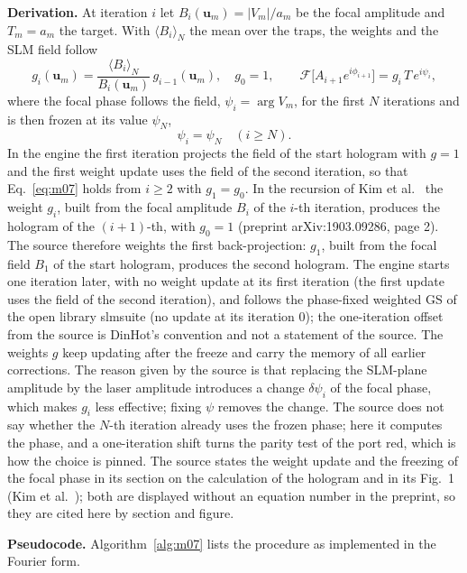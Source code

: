\textbf{Derivation.} At iteration $i$ let $B_i(\mathbf u_m)=|V_m|/a_m$ be the focal amplitude and $T_m=a_m$ the target. With $\langle B_i\rangle_N$ the mean over the traps, the weights and the SLM field follow
\begin{equation}
g_i(\mathbf u_m)=\frac{\langle B_i\rangle_N}{B_i(\mathbf u_m)}\,g_{i-1}(\mathbf u_m),\quad g_0=1,\qquad
\mathcal F\big[A_{i+1}e^{i\phi_{i+1}}\big]=g_i\,T\,e^{i\psi_i},
\label{eq:m07}
\end{equation}
where the focal phase follows the field, $\psi_i=\arg V_m$, for the first $N$ iterations and is then frozen at its value $\psi_N$,
\begin{equation}
\psi_i=\psi_N\quad(i\ge N).
\label{eq:m07-freeze}
\end{equation}
In the engine the first iteration projects the field of the start hologram with $g=1$ and the first weight update uses the field of the second iteration, so that Eq.~\eqref{eq:m07} holds from $i\ge2$ with $g_1=g_0$. In the recursion of Kim et al.~\cite{kim2019} the weight $g_i$, built from the focal amplitude $B_i$ of the $i$-th iteration, produces the hologram of the $(i+1)$-th, with $g_0=1$ (preprint arXiv:1903.09286, page 2). The source therefore weights the first back-projection: $g_1$, built from the focal field $B_1$ of the start hologram, produces the second hologram. The engine starts one iteration later, with no weight update at its first iteration (the first update uses the field of the second iteration), and follows the phase-fixed weighted GS of the open library slmsuite (no update at its iteration 0); the one-iteration offset from the source is DinHot's convention and not a statement of the source. The weights $g$ keep updating after the freeze and carry the memory of all earlier corrections. The reason given by the source is that replacing the SLM-plane amplitude by the laser amplitude introduces a change $\delta\psi_i$ of the focal phase, which makes $g_i$ less effective; fixing $\psi$ removes the change. The source does not say whether the $N$-th iteration already uses the frozen phase; here it computes the phase, and a one-iteration shift turns the parity test of the port red, which is how the choice is pinned. The source states the weight update and the freezing of the focal phase in its section on the calculation of the hologram and in its Fig.~1 (Kim et al.~\cite{kim2019}); both are displayed without an equation number in the preprint, so they are cited here by section and figure.

\textbf{Pseudocode.} Algorithm~\ref{alg:m07} lists the procedure as implemented in the Fourier form.

